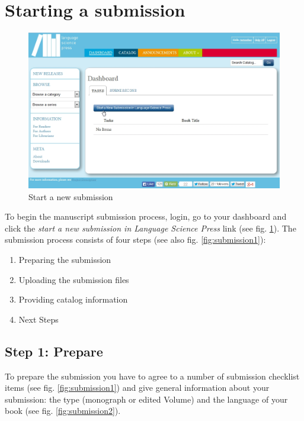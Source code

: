 \section{Starting a submission} \label{sec:submission}
\begin{figure}[h] \centering
\includegraphics[width=1\textwidth]{./img/startSubmission.jpg}
\caption{Start a new submission}
\label{fig:submission}
\end{figure}
To begin the manuscript submission process, login, go to your dashboard and click the \textit{start a new submission in Language Science Press} link (see fig. \ref{fig:submission}). The submission process consists of four steps (see also fig. \ref{fig:submission1}): 
\begin{enumerate}[noitemsep]
\item Preparing the submission
\item Uploading the submission files
\item Providing catalog information  
\item Next Steps
\end{enumerate}

\subsection*{Step 1: Prepare}

To prepare the submission you have to agree to a number of submission checklist items (see fig. \ref{fig:submission1}) and give general information about your submission: the type (monograph or edited Volume) and the language  of your book (see fig. \ref{fig:submission2}).

